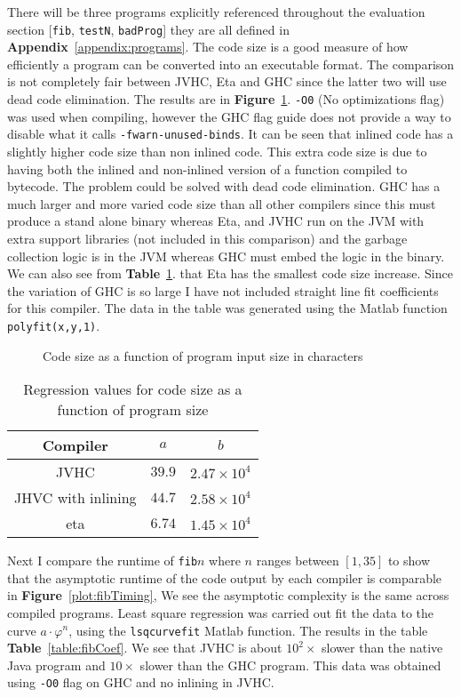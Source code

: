 \documentclass[float=false, crop=false]{standalone}
\newlength\gwidth
\newlength\gheight
\newcommand{\namefig}{\textbf{Figure}~}
\newcommand{\nametable}{\textbf{Table}~}
\newcommand{\importMGraph}[3]{\setlength{\gwidth}{#2}\setlength{\gheight}{#3}{#1}}
\begin{document}
There will be three programs explicitly referenced throughout the evaluation section 
[\texttt{fib}, \texttt{testN}, \texttt{badProg}] they are all defined in 
\textbf{Appendix}~\ref{appendix:programs}.
The code size is a good measure of how efficiently a program can be converted
into an executable format. The comparison is not completely fair
between JVHC, Eta and GHC since the latter two will use dead code 
elimination. The results are in \namefig\ref{plot:codeSize}. \texttt{-O0} (No optimizations flag) 
was used when compiling, however the GHC flag guide \cite{haskell-flag-ref}
does not provide a way to disable what it calls \texttt{-fwarn-unused-binds}.
It can be seen that inlined code has a slightly higher code size than non inlined code.
This extra code size is due to having both the inlined and non-inlined version of a function compiled to
bytecode. The problem could be solved with dead code elimination. GHC has a much larger 
and more varied code size than all other compilers since this must produce a stand alone binary 
whereas Eta, and JVHC run on the JVM with extra support libraries (not included in this comparison) 
and the garbage collection logic is in the JVM whereas GHC must embed the logic in the binary. 
We can also see from \nametable\ref{table:codeSize}. 
that Eta has the smallest code size increase. Since the variation of GHC is so large I have not
included straight line fit coefficients for this compiler. The data in the table
was generated using the Matlab function \verb|polyfit(x,y,1)|.


\begin{figure}
  \centering
  \importMGraph{plotCodeSize.tex}{0.90\textwidth}{0.4\textwidth}
  \caption{Code size as a function of program input size in characters}
  \label{plot:codeSize}
\end{figure}
\begin{table}
  \centering
  \begin{tabular}{ c | c c }
    Compiler& $a$ & $b$\\
    \hline
    JVHC & $39.9$ & $2.47 \times 10^{4}$ \\
    JHVC with inlining & $44.7$ & $2.58 \times 10^{4}$\\
    eta & $6.74$ & $1.45 \times 10^{4}$
  \end{tabular}
  \caption{Regression values for code size as a function of
  program size}
  \label{table:codeSize}
\end{table}

Next I compare the runtime of \texttt{fib}$n$ where $n$ ranges between 
$[1,35]$ to show that the asymptotic runtime of the code output
by each compiler is comparable in \namefig\ref{plot:fibTiming}, 
  We see the asymptotic complexity is the same across compiled programs.
  Least square regression was carried out fit the data to the curve
  $a \cdot \varphi^n$, using the \texttt{lsqcurvefit} Matlab function.
  The results in the table \nametable\ref{table:fibCoef}. We see that JVHC is 
  about $10^2 \times$ slower than the native
  Java program and $10\times $ slower than the GHC program.
  This data was obtained using \texttt{-O0} flag on GHC and no inlining
  in JVHC.
\end{document}
